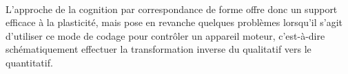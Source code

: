 \documentclass[11pt]{article}
\begin{document}
\paragraph{}	
	
	L'approche de la cognition par correspondance de forme offre donc un support efficace à la plasticité,
	mais pose en revanche quelques problèmes lorsqu'il s'agit d'utiliser ce mode de codage pour contrôler un 
	appareil moteur, c'est-à-dire schématiquement effectuer la transformation inverse du qualitatif vers 
	le quantitatif.
	
	


























%
%
%
%
%	
%	
%	
%	
\end{document}
